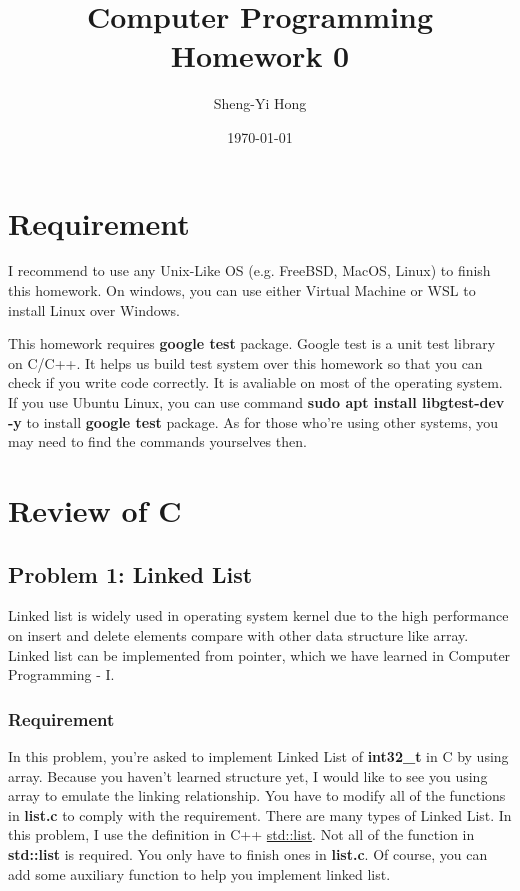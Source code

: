 \documentclass{report}
\title{Computer Programming Homework 0}
\author{Sheng-Yi Hong}
\date{\today}
\begin{document}
\maketitle

\tableofcontents

\chapter{Requirement}

I recommend to use any Unix-Like OS (e.g. FreeBSD, MacOS, Linux) to finish this
homework. On windows, you can use either Virtual Machine or WSL to install Linux over Windows.

This homework requires \textbf{google test} package. Google test is a unit test
library on C/C++. It helps us build test system over this homework so that you can check
if you write code correctly. It is avaliable on most of the operating system.
If you use Ubuntu Linux, you can use command \textbf{sudo apt install
  libgtest-dev -y} to install \textbf{google test} package. As for those who're using other systems, you may need to find the commands yourselves then.

\chapter{Review of C}

\section{Problem 1: Linked List}

Linked list is widely used in operating system kernel due to the high
performance on insert and delete elements compare with other data structure like
array. Linked list can be implemented from pointer, which we have learned in
Computer Programming - I.

\subsection{Requirement}

In this problem, you're asked to implement Linked List of \textbf{int32\_t} in C by
using array. Because you haven't learned structure yet, I would like to see you using array to emulate the linking relationship. You have to modify all of the functions in \textbf{list.c} to
comply with the requirement. There are many types of Linked List. In this
problem, I use the definition in C++
\href{https://en.cppreference.com/w/cpp/container/list}{std::list}. Not all of
the function in \textbf{std::list} is required. You only have to finish ones in
\textbf{list.c}. Of course, you can add some auxiliary function to help you
implement linked list.
\end{document}
